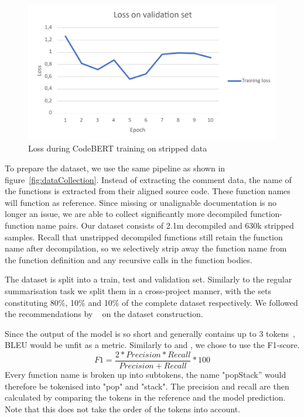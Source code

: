 \begin{figure}[h]
  \centering
  \includegraphics[width=\linewidth]{img/ExtremeLoss.png}
  \caption{Loss during CodeBERT training on stripped data}
  \label{fig:ExtremeLoss}
\end{figure}

To prepare the dataset, we use the same pipeline as shown in figure~\ref{fig:dataCollection}. Instead of extracting the comment data, the name of the functions is extracted from their aligned source code. These function names will function as reference. Since missing or unalignable documentation is no longer an issue, we are able to collect significantly more decompiled function-function name pairs. Our dataset consists of 2.1m decompiled and 630k stripped samples. Recall that unstripped decompiled functions still retain the function name after decompilation, so we selectively strip away the function name from the function definition and any recursive calls in the function bodies. 

The dataset is split into a train, test and validation set. Similarly to the regular summarisation task we split them in a cross-project manner, with the sets constituting 80\%, 10\% and 10\% of the complete dataset respectively. We followed the recommendations by ~\citeauthor{recommend_summarization} on the dataset construction. 

Since the output of the model is so short and generally contains up to 3 tokens~\cite{ExtremeSummarization}, BLEU would be unfit as a metric. Similarly to \citeauthor{ExtremeSummarization} and \citeauthor{PolyglotCodeBERT}, we chose to use the F1-score.
\[\mathit{F1} = \frac{2*\mathit{Precision}*\mathit{Recall}}{\mathit{Precision}+\mathit{Recall}} * 100\] 
Every function name is broken up into subtokens, the name "popStack'' would therefore be tokenised into "pop" and "stack". The precision and recall are then calculated by comparing the tokens in the reference and the model prediction. Note that this does not take the order of the tokens into account.

